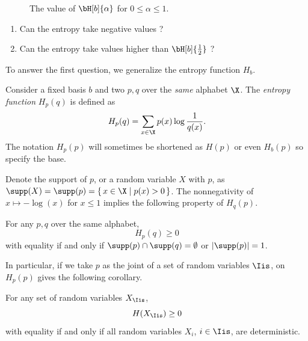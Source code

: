 \documentclass[11pt,twoside,a4paper,openright]{uclouvain-thesis}
\begin{document}
\begin{figure}[!ht]
  \begin{center}
  \end{center}
  \caption{The value of $\bH[b]{\alpha}$ for $0 \leq \alpha \leq 1$.}
  \label{fig:bH}
\end{figure}

\begin{enumerate}
  \item Can the entropy take negative values ?
  \item Can the entropy take values higher than $\bH[b]{\frac{1}{2}}$ ?
\end{enumerate}

To answer the first question, we generalize the entropy function $H_b$.
\begin{mydef}
  Consider a fixed basis $b$ and two \pmfs{} $p, q$ over the \emph{same} alphabet $\X$.
  The \emph{entropy function} $H_p(q)$ is defined as
  \[ H_p(q) = \sum_{x \in \X} p(x) \log \frac{1}{q(x)}. \]
  The notation $H_p(p)$ will sometimes be shortened as $H(p)$ or even $H_b(p)$ so specify the base.
\end{mydef}

Denote the support of $p$, or a random variable $X$ with \pmf{} $p$, as $\supp(X) = \supp(p) = \{\,x \in \X \mid p(x) > 0\,\}$.
The nonnegativity of $x \mapsto -\log(x)$ for $x \leq 1$ implies the following property of $H_q(p)$.
\begin{myprop}
  \label{prop:nonnegative}
  For any \pmfs{} $p, q$ over the same alphabet,
  \[ H_p(q) \geq 0 \]
  with equality if and only if $\supp(p) \cap \supp(q) = \emptyset$ or $|\supp(p)| = 1$.
\end{myprop}
In particular, if we take $p$ as the joint \pmf{} of a set of random variables $\Iis$,
 on $H_p(p)$ gives the following corollary.
\begin{mycoro}
  \label{coro:nonnegative}
  For any set of random variables $X_\Iis$,
  \[ H(X_\Iis) \geq 0 \]
  with equality if and only if all random variables $X_i$, $i \in \Iis$, are deterministic.
\end{mycoro}
\end{document}
